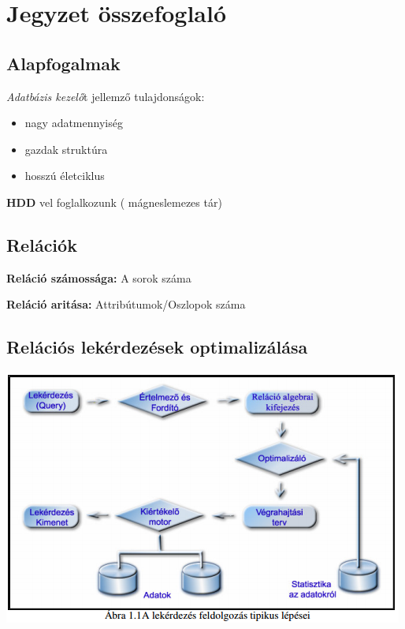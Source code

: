\section{Jegyzet összefoglaló}

\subsection{Alapfogalmak}

	\textit{Adatbázis kezelő}t jellemző tulajdonságok:
	\begin{itemize}
		\item nagy adatmennyiség
		\item gazdak struktúra
		\item hosszú életciklus
	\end{itemize}

	\textbf{HDD} vel foglalkozunk ( mágneslemezes tár)

\subsection{Relációk}

	\textbf{Reláció számossága:} A sorok száma

	\textbf{Reláció aritása:} Attribútumok/Oszlopok száma

\subsection{Relációs lekérdezések optimalizálása}


	\begin{center}
		\includegraphics[scale=0.8]{img/opt1}
	\end{center}

